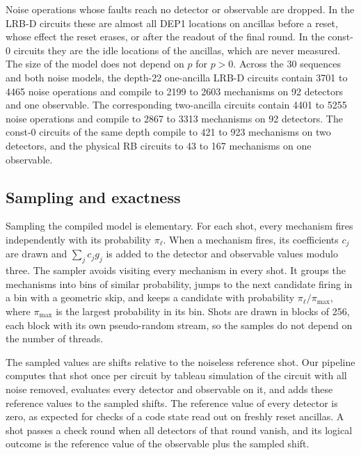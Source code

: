 Noise operations whose faults reach no detector or observable are dropped. In the LRB-D circuits these are almost all DEP1 locations on ancillas before a reset, whose effect the reset erases, or after the readout of the final round. In the const-0 circuits they are the idle locations of the ancillas, which are never measured. The size of the model does not depend on $p$ for $p > 0$. Across the 30 sequences and both noise models, the depth-22 one-ancilla LRB-D circuits contain 3701 to 4465 noise operations and compile to 2199 to 2603 mechanisms on 92 detectors and one observable. The corresponding two-ancilla circuits contain 4401 to 5255 noise operations and compile to 2867 to 3313 mechanisms on 92 detectors. The const-0 circuits of the same depth compile to 421 to 923 mechanisms on two detectors, and the physical RB circuits to 43 to 167 mechanisms on one observable.

\subsection{Sampling and exactness}

Sampling the compiled model is elementary. For each shot, every mechanism fires independently with its probability $\pi_\ell$. When a mechanism fires, its coefficients $c_j$ are drawn and $\sum_j c_j g_j$ is added to the detector and observable values modulo three. The sampler avoids visiting every mechanism in every shot. It groups the mechanisms into bins of similar probability, jumps to the next candidate firing in a bin with a geometric skip, and keeps a candidate with probability $\pi_\ell / \pi_{\max}$, where $\pi_{\max}$ is the largest probability in its bin. Shots are drawn in blocks of 256, each block with its own pseudo-random stream, so the samples do not depend on the number of threads.

The sampled values are shifts relative to the noiseless reference shot. Our pipeline computes that shot once per circuit by tableau simulation of the circuit with all noise removed, evaluates every detector and observable on it, and adds these reference values to the sampled shifts. The reference value of every detector is zero, as expected for checks of a code state read out on freshly reset ancillas. A shot passes a check round when all detectors of that round vanish, and its logical outcome is the reference value of the observable plus the sampled shift.

